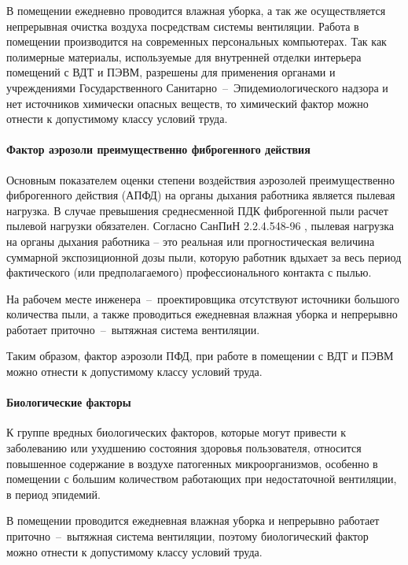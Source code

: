 В помещении ежедневно проводится влажная уборка, а так же осуществляется непрерывная
очистка воздуха посредствам системы вентиляции. Работа в помещении производится
на современных персональных компьютерах. Так как полимерные материалы, используемые
для внутренней отделки интерьера помещений с ВДТ и ПЭВМ, разрешены для применения
органами и учреждениями Государственного Санитарно~--~Эпидемиологического надзора и
нет источников химически опасных веществ, то химический фактор можно отнести к
допустимому классу условий труда.

\paragraph{Фактор аэрозоли преимущественно фиброгенного действия}

Основным показателем оценки степени воздействия аэрозолей преимущественно фиброгенного
действия (АПФД) на органы дыхания работника является пылевая нагрузка. В случае
превышения среднесменной ПДК фиброгенной пыли расчет пылевой нагрузки обязателен.
Согласно СанПиН 2.2.4.548-96 \cite{ecology_sanpin_548_96}, пылевая нагрузка на
органы дыхания работника – это реальная или прогностическая величина суммарной
экспозиционной дозы пыли, которую работник вдыхает за весь период фактического
(или предполагаемого) профессионального контакта с пылью.

На рабочем месте инженера~--~проектировщика отсутствуют источники большого количества
пыли, а также проводиться ежедневная влажная уборка и непрерывно работает
приточно~--~вытяжная система вентиляции.

Таким образом, фактор аэрозоли ПФД, при работе в помещении с ВДТ и ПЭВМ можно
отнести к допустимому классу условий труда.

\paragraph{Биологические факторы}

К группе вредных биологических факторов, которые могут привести к заболеванию
или ухудшению состояния здоровья пользователя, относится повышенное содержание
в воздухе патогенных микроорганизмов, особенно в помещении с большим количеством
работающих при недостаточной вентиляции, в период эпидемий.

В помещении проводится ежедневная влажная уборка и непрерывно работает
приточно~--~вытяжная система вентиляции, поэтому биологический фактор можно отнести
к допустимому классу условий труда.

